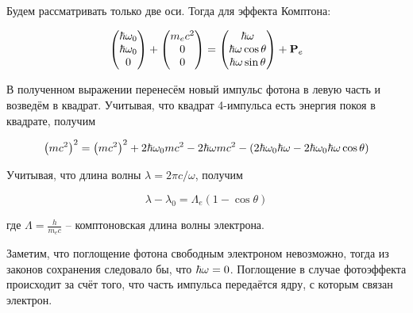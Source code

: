 Будем рассматривать только две оси. Тогда для эффекта Комптона:

\begin{equation}
    \begin{pmatrix}
        \hbar \omega_0 \\
        \hbar \omega_0  \\
        0
    \end{pmatrix}
    +
    \begin{pmatrix}
        m_e c^2 \\
        0 \\
        0
    \end{pmatrix}
    =
    \begin{pmatrix}
        \hbar \omega \\
        \hbar \omega \cos \theta \\
        \hbar \omega \sin \theta
    \end{pmatrix}
    + \mathbf P_e
\end{equation}

\noindent
В полученном выражении перенесём новый импульс фотона в левую часть и возведём в квадрат. Учитывая, что квадрат 4-импульса есть энергия покоя в квадрате, получим

\begin{equation*}
    \left( m c^2 \right)^2 = \left( m c^2 \right)^2 + 2 \hbar \omega_0 m c^2 - 2 \hbar \omega m c^2 - \left( 2 \hbar \omega_0 \hbar \omega - 2 \hbar \omega_0 \hbar \omega \cos \theta \right)
\end{equation*}

\noindent
Учитывая, что длина волны $\lambda = 2 \pi c / \omega$, получим

\begin{equation}
    \lambda - \lambda_0 = \Lambda_e \left( 1 - \cos \theta \right)
\end{equation}

\noindent
где $\Lambda = \frac{h}{m_e c}$ -- комптоновская длина волны электрона.

Заметим, что поглощение фотона свободным электроном невозможно, тогда из законов сохранения следовало бы, что $\hbar \omega = 0$. Поглощение в случае фотоэффекта происходит за счёт того, что часть импульса передаётся ядру, с которым связан электрон.
